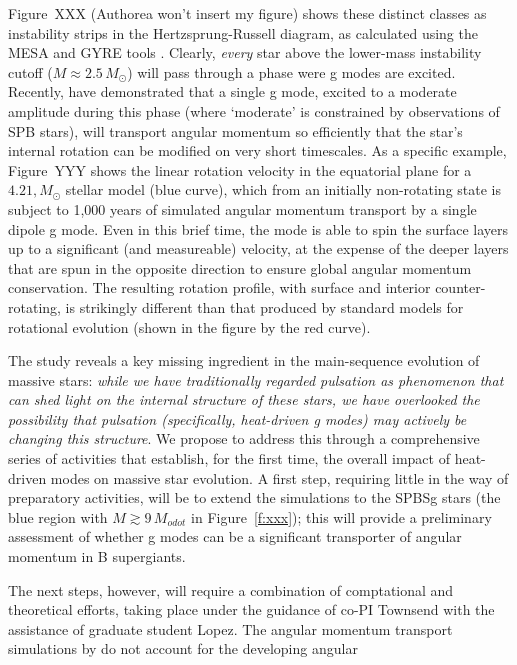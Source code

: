 Figure~XXX (Authorea won't insert my figure) shows these distinct classes as instability strips in the Hertzsprung-Russell diagram, as calculated using the MESA and GYRE tools \citep[adapted from][]{Paxton2015}. Clearly, \emph{every} star above the lower-mass instability cutoff ($M \approx 2.5\,M_{\odot}$) will pass through a phase were g modes are excited. Recently, \citet{Townsend:2017} have demonstrated that a single g mode, excited to a moderate amplitude during this phase (where `moderate' is constrained by observations of SPB stars), will transport angular momentum so efficiently that the star's internal rotation can be modified on very short timescales. As a specific example, Figure~YYY shows the linear rotation velocity in the equatorial plane for a $4.21,M_{\odot}$ stellar model (blue curve), which from an initially non-rotating state is subject to 1,000 years of simulated angular momentum transport by a single dipole g mode. Even in this brief time, the mode is able to spin the surface layers up to a significant (and measureable) velocity, at the expense of the deeper layers that are spun in the opposite direction to ensure global angular momentum conservation. The resulting rotation profile, with surface and interior counter-rotating, is strikingly different than that produced by standard models for rotational evolution (shown in the figure by the red curve).

The \citet{Townsend:2017} study reveals a key missing ingredient in the main-sequence evolution of massive stars: \emph{while we have traditionally regarded pulsation as phenomenon that can shed light on the internal structure of these stars, we have overlooked the possibility that pulsation (specifically, heat-driven g modes) may actively be changing this structure}. We propose to address this through a comprehensive series of activities that establish, for the first time, the overall impact of heat-driven modes on massive star evolution. A first step, requiring little in the way of preparatory activities, will be to extend the \citet{Townsend:2017} simulations to the SPBSg stars (the blue region with $M \gtrsim 9\,M_{odot}$ in Figure~\ref{f:xxx}); this will provide a preliminary assessment of whether g modes can be a significant transporter of angular momentum in B supergiants.

The next steps, however, will require a combination of comptational and theoretical efforts, taking place under the guidance of co-PI Townsend with the assistance of graduate student Lopez. The angular momentum transport simulations by \citet{Townsend:2017} do not account for the developing angular 